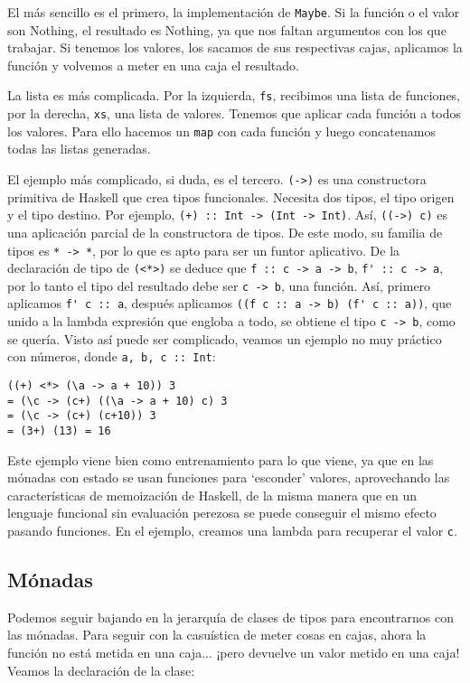 \documentclass[class=article, crop=false]{standalone}
\begin{document}
El más sencillo es el primero, la implementación de \verb`Maybe`. Si la función o el valor
son Nothing, el resultado es Nothing, ya que nos faltan argumentos con los que trabajar. Si
tenemos los valores, los sacamos de sus respectivas cajas, aplicamos la función y volvemos a
meter en una caja el resultado.

La lista es más complicada. Por la izquierda, \verb`fs`, recibimos una lista de funciones,
por la derecha, \verb`xs`, una lista de valores. Tenemos que aplicar cada función a todos los
valores. Para ello hacemos un \verb`map` con cada función y luego concatenamos todas las
listas generadas.

El ejemplo más complicado, si duda, es el tercero. \verb`(->)` es una constructora primitiva
de Haskell que crea tipos funcionales. Necesita dos tipos, el tipo origen y el tipo destino.
Por ejemplo, \verb`(+) :: Int -> (Int -> Int)`. Así, \verb`((->) c)` es una aplicación
parcial de la constructora de tipos. De este modo, su familia de tipos es \verb`* -> *`, por
lo que es apto para ser un funtor aplicativo. De la declaración de tipo de \verb`(<*>)` se
deduce que \verb`f :: c -> a -> b`, \verb`f' :: c -> a`, por lo tanto el tipo del resultado
debe ser \verb`c -> b`, una función. Así, primero aplicamos \verb`f' c :: a`, después
aplicamos \verb`((f c :: a -> b) (f' c :: a))`, que unido a la lambda expresión que engloba a
todo, se obtiene el tipo \verb`c -> b`, como se quería. Visto así puede ser complicado,
veamos un ejemplo no muy práctico con números, donde \verb`a, b, c :: Int`:

\verb`((+) <*> (\a -> a + 10)) 3` \\
\verb`= (\c -> (c+) ((\a -> a + 10) c) 3` \\
\verb`= (\c -> (c+) (c+10)) 3` \\
\verb`= (3+) (13) = 16`

Este ejemplo viene bien como entrenamiento para lo que viene, ya que en las mónadas con
estado se usan funciones para `esconder' valores, aprovechando las características de
memoización de Haskell, de la misma manera que en un lenguaje funcional sin evaluación
perezosa se puede conseguir el mismo efecto pasando funciones. En el ejemplo, creamos una
lambda para recuperar el valor \verb`c`.

\subsection{Mónadas}
Podemos seguir bajando en la jerarquía de clases de tipos para encontrarnos con las mónadas.
Para seguir con la casuística de meter cosas en cajas, ahora la función no está metida en una
caja... ¡pero devuelve un valor metido en una caja! Veamos la declaración de la clase:
\end{document}
